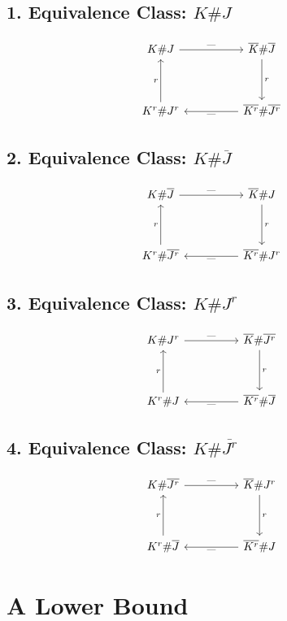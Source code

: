 \documentclass[10pt]{article}
\begin{document}
\subsection*{1. Equivalence Class: $K \# J$}
\[
\begin{tikzcd}[row sep=huge, column sep=huge]
K \# J \arrow[r, "\text{---}"] 
       & \overline{K} \# \overline{J} \arrow[d, "r"] \\
K^r \# J^r \arrow[u, "r"] 
       & \overline{K^r} \# \overline{J^r} \arrow[l, "\text{---}"]
\end{tikzcd}
\]

\subsection*{2. Equivalence Class: $K \# \overline{J}$}
\[
\begin{tikzcd}[row sep=huge, column sep=huge]
K \# \overline{J} \arrow[r, "\text{---}"] 
                  & \overline{K} \# J \arrow[d, "r"] \\
K^r \# \overline{J^r} \arrow[u, "r"] 
                  & \overline{K^r} \# J^r \arrow[l, "\text{---}"]
\end{tikzcd}
\]

\subsection*{3. Equivalence Class: $K \# J^r$}
\[
\begin{tikzcd}[row sep=huge, column sep=huge]
K \# J^r \arrow[r, "\text{---}"] 
         & \overline{K} \# \overline{J^r} \arrow[d, "r"] \\
K^r \# J \arrow[u, "r"] 
         & \overline{K^r} \# \overline{J} \arrow[l, "\text{---}"]
\end{tikzcd}
\]

\subsection*{4. Equivalence Class: $K \# \overline{J^r}$}
\[
\begin{tikzcd}[row sep=huge, column sep=huge]
K \# \overline{J^r} \arrow[r, "\text{---}"] 
                    & \overline{K} \# J^r \arrow[d, "r"] \\
K^r \# \overline{J} \arrow[u, "r"] 
                    & \overline{K^r} \# J \arrow[l, "\text{---}"]
\end{tikzcd}
\]

\newpage
\section{A Lower Bound}
\end{document}
